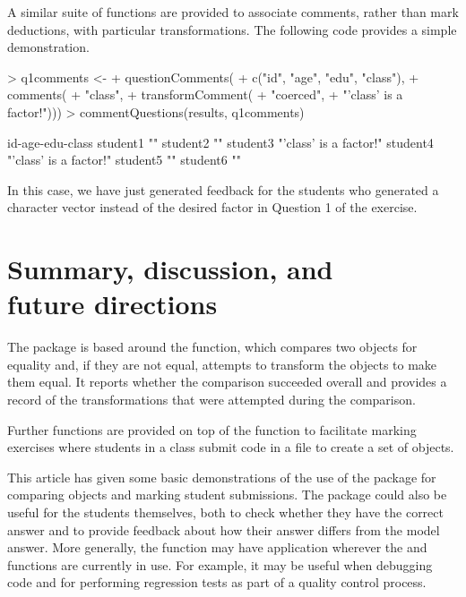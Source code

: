A similar suite of functions are provided to associate comments,
rather than mark deductions, with  
particular transformations.  The following code provides
 a simple demonstration.

\begin{Schunk}
\begin{Sinput}
> q1comments <-
+     questionComments(
+         c("id", "age", "edu", "class"),
+         comments(
+             "class",
+             transformComment(
+                 "coerced",
+                 "'class' is a factor!")))
> commentQuestions(results, q1comments)
\end{Sinput}
\begin{Soutput}
         id-age-edu-class      
student1 ""                    
student2 ""                    
student3 "'class' is a factor!"
student4 "'class' is a factor!"
student5 ""                    
student6 ""                    
\end{Soutput}
\end{Schunk}
In  this case, we have just generated feedback for the students
who generated a character vector instead of the desired factor
in Question 1 of the exercise.

\section*{Summary, discussion, and\\future directions}

The  package is based around the  
function, which compares two objects for equality and, if they
are not equal, attempts
to transform the objects to make them equal.  It reports whether 
the comparison succeeded overall and provides a record of 
the transformations that were
attempted during the comparison.

Further functions are provided on top of the  
function to facilitate marking exercises where students in a class
submit \R{} code in a file to create a set of \R{} objects.

This article has given some basic demonstrations of the use of 
the  package for comparing objects and marking 
student submissions.  The package could also be useful for the
students themselves, both to check whether they have the correct 
answer and to provide feedback about how their answer differs 
from the model answer.  More generally, the 
function may have application wherever the 
and  functions are currently in use.  For example,
it may be useful when debugging code and for performing regression
tests as part of a quality control process.

